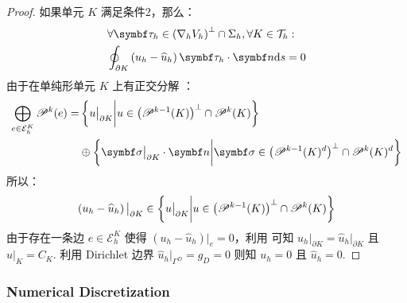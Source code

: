 \begin{theorem}
\begin{proof}
		如果单元 \(K\) 满足条件2，那么：
		\begin{equation*}
			\begin{aligned}
				& \forall \bm\tau_{h} \in \left(\nabla_{h} V_{h}\right)^{\perp} \cap \Sigma_{h}, \forall K \in \mathcal{T}_{h}: \\
				& \oint_{\partial K} \left(u_{h} - \widehat{u}_{h}\right) \bm\tau_{h} \cdot \bm n \d s = 0
			\end{aligned}
		\end{equation*}
		由于在单纯形单元 \(K\) 上有正交分解 \cite[Lemma 2.2]{10.1007/978-3-030-27230-2_2}：
		\begin{equation*}
			\begin{aligned}
				\bigoplus_{e\in\mathcal{E}_{h}^{K}} \mathscr{P}^{k}(e)
				= & \B{u\big|_{\partial K} \bigg| u \in \left(\mathscr{P}^{k-1}(K)\right)^{\perp} \cap \mathscr{P}^{k}(K)} \\
				& \oplus \B{\bm\sigma \big|_{\partial K} \cdot \bm n \bigg| \bm\sigma \in \left(\mathscr{P}^{k-1}(K)^{d}\right)^{\perp} \cap \mathscr{P}^{k}(K)^{d}}
			\end{aligned}
		\end{equation*}
		所以：
		\begin{equation*}
			\left(u_{h} - \widehat{u}_{h}\right)\big|_{\partial K} \in \left\{u\big|_{\partial K} \bigg| u \in \left(\mathscr{P}^{k-1}(K)\right)^{\perp} \cap \mathscr{P}^{k}(K)\right\}
		\end{equation*}
		由于存在一条边 \(e \in \mathcal{E}_{h}^{K}\) 使得 \(\left(u_{h} - \widehat{u}_{h}\right)\big|_{e} = 0\)，利用 \cite[Lemma 2.1(a)]{10.1007/978-3-030-27230-2_2} 可知 \(u_{h}\big|_{\partial K} = \widehat{u}_{h}\big|_{\partial K}\) 且 \(u\big|_{K} = C_{K}\). 利用 Dirichlet 边界 \(\widehat{u}_{h}\big|_{\Gamma^{D}} = g_{D} = 0\) 则知 \(u_{h} = 0\) 且 \(\widehat{u}_{h} = 0\).
	\end{proof}
\end{theorem}


\subsubsection{Numerical Discretization}

